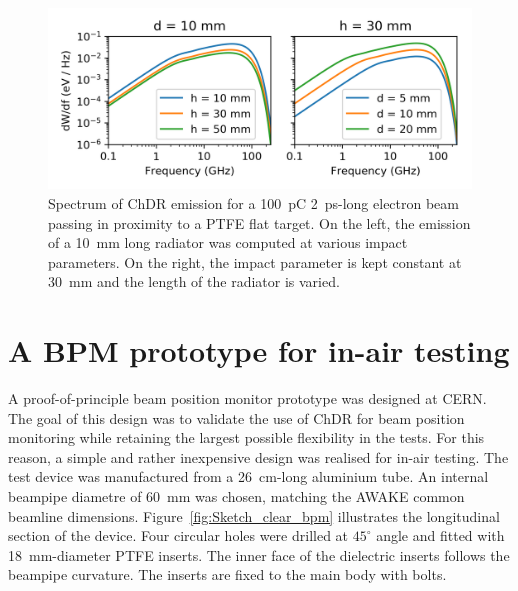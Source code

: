 \begin{figure}[!h]
\centering
\includegraphics[scale=1, keepaspectratio]{pictures/PCA_h_d_scan}
\caption{Spectrum of ChDR emission for a 100~pC 2~ps-long electron beam passing in proximity to a PTFE flat target. On the left, the emission of a 10~mm long radiator was computed at various impact parameters. On the right, the impact parameter is kept constant at 30~mm and the length of the radiator is varied.}
\label{fig:PCA_h_scan}
\end{figure}






\section[A BPM prototype for in-air testing]{A BPM prototype for in-air testing}\label{sec:description}


A proof-of-principle beam position monitor prototype was designed at CERN. The goal of this design was to validate the use of ChDR for beam position monitoring while retaining the largest possible flexibility in the tests. For this reason, a simple and rather inexpensive design was realised for in-air testing. The test device was manufactured from a 26~cm-long aluminium tube. An internal beampipe diametre of 60~mm was chosen, matching the AWAKE common beamline dimensions. Figure~\ref{fig:Sketch_clear_bpm} illustrates the longitudinal section of the device. Four circular holes were drilled at $45^\circ$ angle and fitted with 18~mm-diameter PTFE inserts. The inner face of the dielectric inserts follows the beampipe curvature. The inserts are fixed to the main body with bolts.


